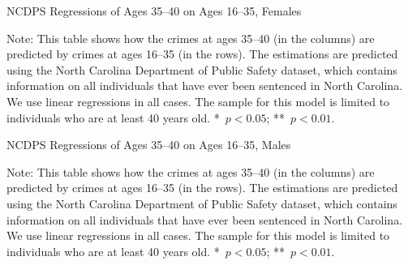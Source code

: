 \begin{table}
\caption{NCDPS Regressions of Ages 35--40 on Ages 16--35, Females} \label{tab:reg1f}
\begin{adjustbox}{max width=\textwidth}
\begin{threeparttable}

\begin{tablenotes}
\item Note: This table shows how the crimes at ages 35--40 (in the columns) are predicted by crimes at ages 16--35 (in the rows). The estimations are predicted using the North Carolina Department of Public Safety dataset, which contains information on all individuals that have ever been sentenced in North Carolina. We use linear regressions in all cases. The sample for this model is limited to individuals who are at least 40 years old. *~$p<0.05$; **~$p<0.01$.
\end{tablenotes}
\end{threeparttable}
\end{adjustbox}
\end{table}


\begin{table}
\caption{NCDPS Regressions of Ages 35--40 on Ages 16--35, Males} \label{tab:reg1m}
\begin{adjustbox}{max width=\textwidth}
\begin{threeparttable}

\begin{tablenotes}
\item Note: This table shows how the crimes at ages 35--40 (in the columns) are predicted by crimes at ages 16--35 (in the rows). The estimations are predicted using the North Carolina Department of Public Safety dataset, which contains information on all individuals that have ever been sentenced in North Carolina. We use linear regressions in all cases. The sample for this model is limited to individuals who are at least 40 years old. *~$p<0.05$; **~$p<0.01$.
\end{tablenotes}
\end{threeparttable}
\end{adjustbox}
\end{table}

